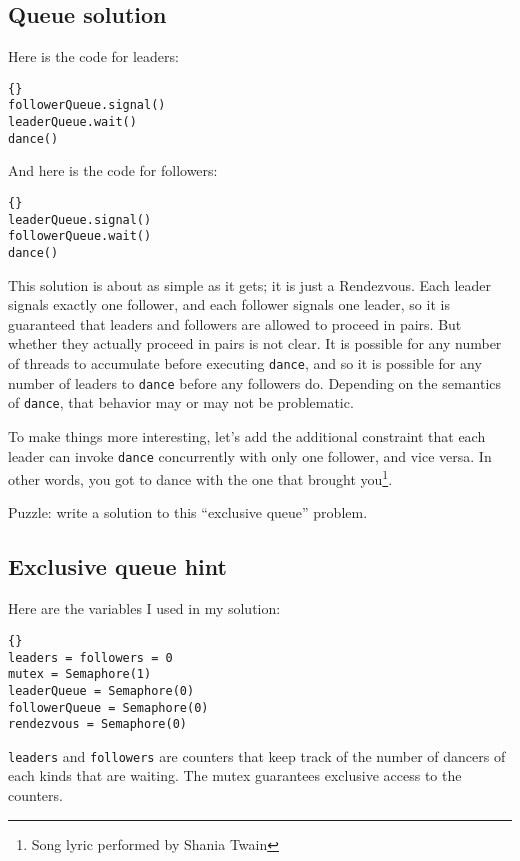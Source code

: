 \documentclass{book}
\newcommand{\clearemptydoublepage}{\newpage\cleardoublepage}
\begin{document}
\clearemptydoublepage
\subsection {Queue solution}

Here is the code for leaders:

\begin{lstlisting}[title={Queue solution (leaders)}]{}
followerQueue.signal()
leaderQueue.wait()
dance()
\end{lstlisting}

And here is the code for followers:

\begin{lstlisting}[title={Queue solution (followers)}]{}
leaderQueue.signal()
followerQueue.wait()
dance()
\end{lstlisting}

This solution is about as simple as it gets; it is just a Rendezvous.
Each leader signals exactly one follower, and each follower signals
one leader, so it is guaranteed that leaders and followers are
allowed to proceed in pairs.  But whether they actually proceed in
pairs is not clear.  It is possible for any number of threads to
accumulate before executing {\tt dance}, and so it is possible for
any number of leaders to {\tt dance} before any followers do.
Depending on the semantics of {\tt dance}, that behavior may or
may not be problematic.

To make things more interesting, let's add the additional constraint
that each leader can invoke {\tt dance} concurrently with only
one follower, and vice versa.  In other words, you got to dance
with the one that brought you\footnote{Song lyric performed by Shania
Twain}.

Puzzle: write a solution to this ``exclusive queue'' problem.

\clearemptydoublepage
\subsection {Exclusive queue hint}

Here are the variables I used in my solution:

\begin{lstlisting}[title={Queue hint}]{}
leaders = followers = 0
mutex = Semaphore(1)
leaderQueue = Semaphore(0)
followerQueue = Semaphore(0)
rendezvous = Semaphore(0)
\end{lstlisting}

{\tt leaders} and {\tt followers} are counters that
keep track of the number of dancers of each kinds that are
waiting.  The mutex guarantees exclusive access to the counters.
\end{document}
